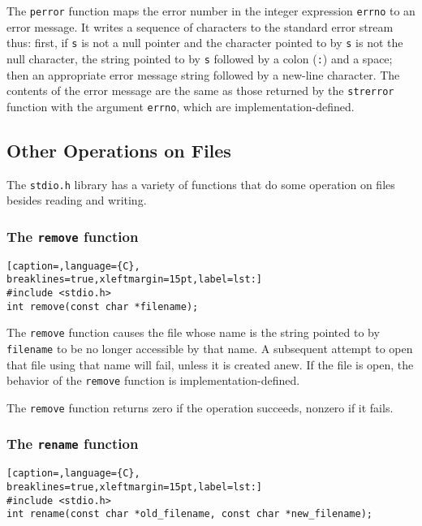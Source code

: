 The \texttt{perror} function maps the error number in the integer expression
\texttt{errno} to an error message. It writes a sequence of characters to the
standard error stream thus: first, if \texttt{s} is not a null pointer and the
character pointed to by \texttt{s} is not the null character, the string
pointed to by \texttt{s} followed by a colon (\texttt{:}) and a space; then an
appropriate error message string followed by a new-line character. The contents
of the error message are the same as those returned by the \texttt{strerror}
function with the argument \texttt{errno}, which are implementation-defined.

\subsection{Other Operations on Files}
The \texttt{stdio.h} library has a variety of functions that do some operation
on files besides reading and writing.

\subsubsection{The \texttt{remove} function}
\lstset{basicstyle=\scriptsize, numbers=left, captionpos=b, tabsize=4}
\begin{lstlisting}[caption=,language={C},
breaklines=true,xleftmargin=15pt,label=lst:]
#include <stdio.h>
int remove(const char *filename);
\end{lstlisting}

The \texttt{remove} function causes the file whose name is the string pointed
to by \texttt{filename} to be no longer accessible by that name. A subsequent
attempt to open that file using that name will fail, unless it is created anew.
If the file is open, the behavior of the \texttt{remove} function is
implementation-defined.

The \texttt{remove} function returns zero if the operation succeeds, nonzero if
it fails.

\subsubsection{The \texttt{rename} function}
\lstset{basicstyle=\scriptsize, numbers=left, captionpos=b, tabsize=4}
\begin{lstlisting}[caption=,language={C},
breaklines=true,xleftmargin=15pt,label=lst:]
#include <stdio.h>
int rename(const char *old_filename, const char *new_filename);
\end{lstlisting}

